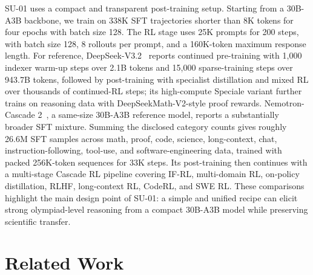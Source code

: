 \documentclass{llmxive}
\begin{document}
SU-01 uses a compact and transparent post-training setup. Starting from a
30B-A3B backbone, we train on 338K SFT trajectories shorter than 8K tokens for
four epochs with batch size 128. The RL stage uses 25K prompts for 200 steps,
with batch size 128, 8 rollouts per prompt, and a 160K-token maximum response
length. 
For reference, DeepSeek-V3.2~\citep{deepseekai2025deepseekv32} reports
continued pre-training with 1,000 indexer warm-up steps over 2.1B tokens and
15,000 sparse-training steps over 943.7B tokens, followed by post-training with
specialist distillation and mixed RL over thousands of continued-RL steps; its
high-compute Speciale variant further trains on reasoning data with DeepSeekMath-V2-style proof rewards. 
Nemotron-Cascade 2~\citep{yang2026nemotroncascade2}, a same-size 30B-A3B
reference model, reports a substantially broader SFT mixture. Summing the
disclosed category counts gives roughly 26.6M SFT samples across math, proof,
code, science, long-context, chat, instruction-following, tool-use, and
software-engineering data, trained with packed 256K-token sequences for 33K
steps. Its post-training then continues with a multi-stage Cascade RL pipeline
covering IF-RL, multi-domain RL, on-policy distillation, RLHF, long-context RL,
CodeRL, and SWE RL. 
These comparisons highlight the main design point of SU-01:
a simple and unified recipe can elicit strong olympiad-level reasoning from a
compact 30B-A3B model while preserving scientific transfer.
\section{Related Work}
\end{document}
